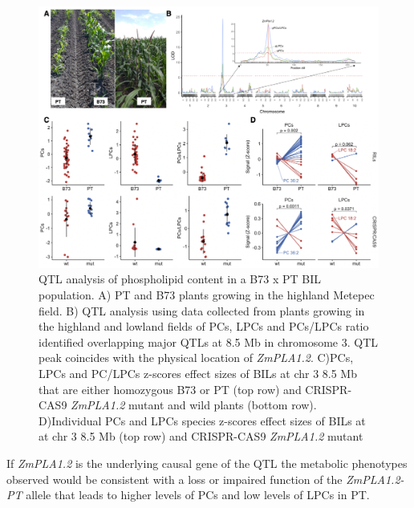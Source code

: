 \documentclass[9pt,twocolumn,twoside,lineno]{BioRxiv}
\begin{document}
\begin{figure}[h]
\begin{center}
\includegraphics[width=0.8\paperwidth]{Figures/Fig_3.png}
\caption{QTL analysis of phospholipid content in a B73 x PT BIL population. 
A) PT and B73 plants growing in the highland Metepec field. 
B) QTL analysis using data collected from plants growing in the highland and lowland fields of PCs, LPCs and PCs/LPCs ratio identified overlapping major QTLs at 8.5 Mb in chromosome 3. 
QTL peak coincides with the physical location of \textit{ZmPLA1.2}. 
C)PCs, LPCs and PC/LPCs z-scores effect sizes of BILs at chr 3 8.5 Mb that are either homozygous B73 or PT (top row) and CRISPR-CAS9 \textit{ZmPLA1.2} mutant and wild plants (bottom row).        
D)Individual PCs and LPCs species z-scores effect sizes of BILs at at chr 3 8.5 Mb (top row) and CRISPR-CAS9 \textit{ZmPLA1.2} mutant}
\label{Fig3}
\end{center}
\end{figure} 
If \textit{ZmPLA1.2} is the underlying causal gene of the QTL the metabolic phenotypes observed would be consistent with a loss or impaired function of the \textit{ZmPLA1.2-PT} allele that leads to higher levels of PCs and low levels of LPCs in PT. 
\end{document}
